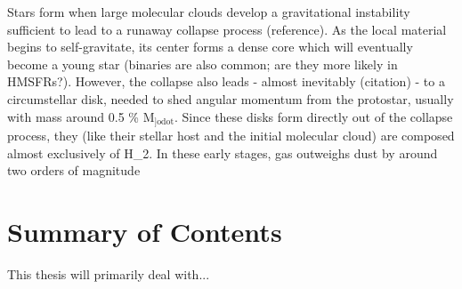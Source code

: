 Stars form when large molecular clouds develop a gravitational instability sufficient to lead to a runaway collapse process (reference). As the local material begins to self-gravitate, its center forms a dense core which will eventually become a young star (binaries are also common; are they more likely in HMSFRs?). However, the collapse also leads - almost inevitably (citation) - to a circumstellar disk, needed to shed angular momentum from the protostar, usually with mass around 0.5 \% M$_{\text{]odot}}$. Since these disks form directly out of the collapse process, they (like their stellar host and the initial molecular cloud) are composed almost exclusively of H_2. In these early stages, gas outweighs dust by around two orders of magnitude





\section{Summary of Contents}
This thesis will primarily deal with...
